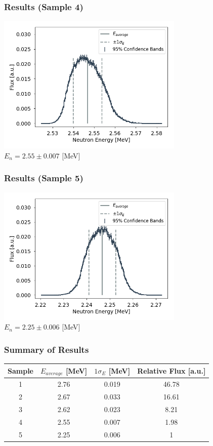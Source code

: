 \documentclass[12pt,xcolor=dvipsnames]{beamer}
\begin{document}
\begin{frame}
\frametitle{Results (Sample 4)}
\centering
\includegraphics[width=3.5in]{3609False.png}\\
$E_n=2.55\pm 0.007$ [MeV]
\end{frame}

\begin{frame}
\frametitle{Results (Sample 5)}
\centering
\includegraphics[width=3.5in]{460-7True.png}\\
$E_n=2.25\pm 0.006$ [MeV]
\end{frame}

\begin{frame}
\frametitle{Summary of Results}
\begin{center}
\begin{tabular}{c|ccc}
\hline 
Sample & $E_{average}$ [MeV] & $1\sigma_E$ [MeV] & Relative Flux [a.u.] \\ 
\hline 
1 & 2.76 & 0.019 & 46.78 \\ 
2 & 2.67 & 0.033 & 16.61 \\ 
3 & 2.62 & 0.023 & 8.21 \\ 
4 & 2.55 & 0.007 & 1.98 \\ 
5 & 2.25 & 0.006 & 1 \\ 
\hline 
\end{tabular}
\end{center}
\end{frame}
\end{document}
